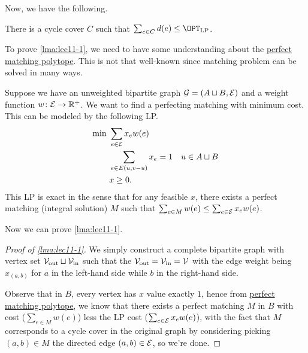 Now, we have the following.

\begin{lemma}\label{lma:lec11-1}
	There is a cycle cover \(C\) such that \(\sum_{e\in C} d(e) \leq \OPT_{\mathrm{LP} }\).
\end{lemma}

To prove \autoref{lma:lec11-1}, we need to have some understanding about the \hyperref[rmk:perfect-matching-polytope]{perfect matching polytope}. This is not that well-known since matching problem can be solved in many ways.

\begin{remark}\label{rmk:perfect-matching-polytope}
	Suppose we have an unweighted bipartite graph \(\mathcal{\MakeUppercase{g}} =(A \sqcup B, \mathcal{\MakeUppercase{e}} )\) and a weight function \(w\colon \mathcal{\MakeUppercase{e}} \to \mathbb{\MakeUppercase{r}} ^+\). We want to find a perfecting matching with minimum cost. This can be modeled by the following LP.
	\begin{align*}
		\min~ & \sum_{e\in \mathcal{\MakeUppercase{e}} } x_e w(e)                  \\
		      & \sum_{e\in E(u, v-u)} x_e = 1                     & u\in A\sqcup B \\
		      & x\geq 0.
	\end{align*}
	This LP is exact in the sense that for any feasible \(x\), there exists a perfect matching (integral solution) \(M\) such that \(\sum_{e\in M} w(e) \leq \sum_{e\in \mathcal{\MakeUppercase{e}}} x_e w(e)\).
\end{remark}

\vspace*{1em}
Now we can prove \autoref{lma:lec11-1}.
\begin{proof}[Proof of \autoref{lma:lec11-1}]
	We simply construct a complete bipartite graph with vertex set \(\mathcal{\MakeUppercase{v}}_{\text{out}} \sqcup \mathcal{\MakeUppercase{v}}_{\text{in} }\) such that the \(\mathcal{\MakeUppercase{v}} _{\text{out} }= \mathcal{\MakeUppercase{v}} _{\text{in} }= \mathcal{\MakeUppercase{v}} \) with the edge weight being \(x_{(a, b)}\) for \(a\) in the left-hand side while \(b\) in the right-hand side.

	Observe that in \(B\), every vertex has \(x\) value exactly \(1\), hence from \hyperref[rmk:perfect-matching-polytope]{perfect matching polytope}, we know that there exists a perfect matching \(M\) in \(B\) with cost (\(\sum_{e\in M} w(e)\)) less the LP cost (\(\sum_{e\in \mathcal{\MakeUppercase{e}} } x_e w(e)\)), with the fact that \(M\) corresponds to a cycle cover in the original graph by considering picking \((a, b)\in M\) the directed edge \((a, b)\in \mathcal{\MakeUppercase{e}} \),  so we're done.
\end{proof}

